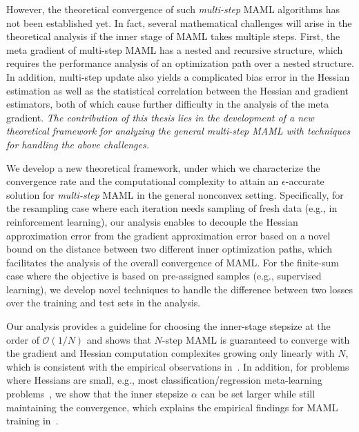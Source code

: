 \documentclass{osudissert96}
\begin{document}
However, the theoretical convergence of such {\em multi-step} MAML algorithms has not been established yet. In fact, several mathematical challenges will arise in the theoretical analysis if the inner stage of MAML takes multiple steps. First, the meta gradient of multi-step MAML has a nested and recursive structure, which requires the performance analysis of an optimization path over a nested structure. In addition, multi-step update also yields a complicated bias error in the Hessian estimation as well as the statistical correlation between the Hessian and gradient estimators, both of which cause further difficulty in the analysis of the meta gradient. {\em The contribution of this thesis lies in the development of a new theoretical framework for analyzing the general {\em multi-step} MAML with techniques for handling the above challenges. }


\vspace{0.15cm}
 We develop a new theoretical framework, under which we characterize the convergence rate and the computational complexity to attain an $\epsilon$-accurate solution for {\em multi-step} MAML in the general nonconvex setting. Specifically, for the resampling case where each iteration needs sampling of fresh data (e.g., in reinforcement learning), our analysis enables to decouple the Hessian approximation error from the gradient approximation error based on a novel bound on the distance between two different inner optimization paths, which facilitates the analysis of the overall convergence of MAML. For the finite-sum case where the objective is based on pre-assigned samples (e.g., supervised learning), we develop novel techniques to handle the difference between two losses over the training and  test sets in the  analysis. 

Our analysis provides a guideline for choosing the inner-stage stepsize at the order of $\mathcal{O}(1/N)$ and shows that  $N$-step MAML is guaranteed to converge with the gradient and Hessian computation complexites  growing only linearly with $N$, which is consistent with the empirical observations in~\cite{antoniou2019train}.
In addition, for problems where Hessians are small, e.g., most classification/regression meta-learning problems~\cite{finn2017model}, we show that the inner stepsize $\alpha$ can be set  larger while still maintaining the convergence,
which explains the empirical findings for MAML training in~\cite{finn2017model,rajeswaran2019meta}.
\end{document}
